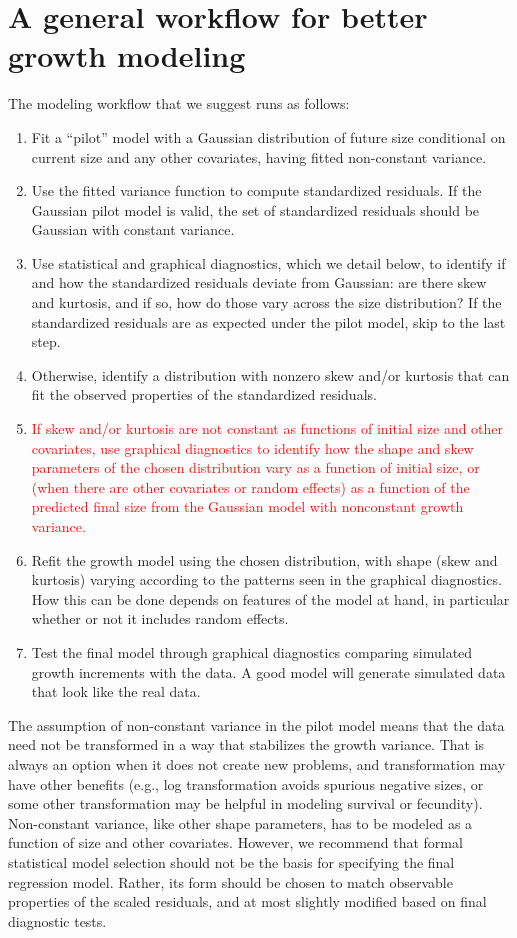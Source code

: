 \documentclass[11pt]{article}
\newcommand{\new}{\textcolor{red}}
\begin{document}
{\section{A general workflow for better growth modeling}

The modeling workflow that we suggest runs as follows:
\begin{enumerate}
\item Fit a ``pilot'' model with a Gaussian distribution of future size conditional on current size and any other covariates, 
having fitted non-constant variance. 
\item Use the fitted variance function to compute standardized residuals. If the Gaussian pilot model is valid, the set of standardized
residuals should be Gaussian with constant variance. 
\item Use statistical and graphical diagnostics, which we detail below, to identify if and how the standardized residuals deviate
from Gaussian: are there skew and kurtosis, and if so, how do those vary across the size distribution? If the standardized residuals
are as expected under the pilot model, skip to the last step. 
\item Otherwise, identify a distribution with nonzero skew and/or kurtosis that can fit the observed properties of the 
standardized residuals. 
\item \new{If skew and/or kurtosis are not constant as functions of initial size and other covariates, use graphical diagnostics
to identify how the shape and skew parameters of the chosen distribution vary as a function of initial size, 
or (when there are other covariates or random effects) as a function of the predicted final size
from the Gaussian model with nonconstant growth variance.}   
\item Refit the growth model using the chosen distribution, with shape (skew and kurtosis) varying according to the patterns 
seen in the graphical diagnostics. How this can be done depends on features of the model at hand, in particular whether or not it
includes random effects. 
\item Test the final model through graphical diagnostics comparing simulated growth increments with the data. 
A good model will generate simulated data that look like the real data.  
\end{enumerate}
The assumption of non-constant variance in the pilot model means that the data need not be transformed in a way that stabilizes
the growth variance. That is always an option when it does not create new problems, and transformation may  
have other benefits (e.g., log transformation avoids spurious negative sizes, or some other transformation
may be helpful in modeling survival or fecundity). Non-constant variance, like other shape parameters, has to be modeled
as a function of size and other covariates. However, we recommend that formal statistical model selection 
should not be the basis for specifying the final regression model. Rather, its form should be chosen to 
match observable properties of the scaled residuals, and at most slightly modified based on final diagnostic tests. 

}
\end{document}
